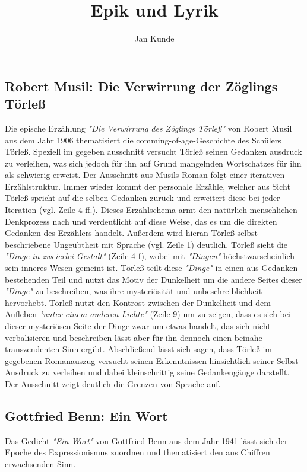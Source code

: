 \documentclass{article}
\author{Jan Kunde}
\date{}
\title{Epik und Lyrik}
\begin{document}
\raggedright
\maketitle
\subsection*{Robert Musil: Die Verwirrung der Zöglings Törleß}
    Die epische Erzählung\textit{\textit{ "Die Verwirrung des Zöglings Törleß" }}von Robert Musil aus dem Jahr 1906 thematisiert die comming-of-age-Geschichte des Schülers Törleß.
    Speziell im gegeben ausschnitt versucht Törleß seinen Gedanken ausdruck zu verleihen, was sich jedoch für ihn auf Grund mangelnden Wortschatzes für ihn als schwierig erweist.
    \break\break
    Der Ausschnitt aus Musils Roman folgt einer iterativen Erzählstruktur. Immer wieder
    kommt der personale Erzähle, welcher aus Sicht Törleß spricht auf die selben Gedanken zurück
    und erweitert diese bei jeder Iteration (vgl. Zeile 4 ff.). Dieses Erzählschema
    armt den natürlich menschlichen Denkprozess nach und verdeutlicht auf diese Weise,
    das es um die direkten Gedanken des Erzählers handelt. Außerdem wird hieran Törleß selbst beschriebene
    Ungeübtheit mit Sprache (vgl. Zeile 1) deutlich.
    \break
    \noindent
    Törleß sieht die\textit{ "Dinge in zweierlei Gestalt" }(Zeile 4 f), wobei mit\textit{ "Dingen" }höchstwarscheinlich
    sein inneres Wesen gemeint ist. Törleß teilt diese\textit{ "Dinge" }in einen aus Gedanken bestehenden Teil
    und nutzt das Motiv der Dunkelheit um die andere Seites dieser\textit{ "Dinge" }zu beschreiben, was ihre
    mysteriösität und unbeschreiblichkeit hervorhebt.\break
    Törleß nutzt den Kontrost zwischen der Dunkelheit und dem Aufleben\textit{ "unter einem anderen Lichte" }
    (Zeile 9) um zu zeigen, dass es sich bei dieser mysteriösen Seite der Dinge zwar um etwas handelt,
    das sich nicht verbalisieren und beschreiben lässt aber für ihn dennoch einen beinahe transzendenten
    Sinn ergibt.
    \break\break
    Abschließend lässt sich sagen, dass Törleß im gegebenen Romanauszug versucht seinen Erkenntnissen
    hinsichtlich seiner Selbst Ausdruck zu verleihen und dabei kleinschrittig seine Gedankengänge darstellt.
    Der Ausschnitt zeigt deutlich die Grenzen von Sprache auf.
\pagebreak
\subsection*{Gottfried Benn: Ein Wort}
    Das Gedicht \textit{"Ein Wort"} von Gottfried Benn aus dem Jahr 1941 lässt sich der Epoche des Expressionismus
    zuordnen und thematisiert den aus Chiffren erwachsenden Sinn.
\end{document}
